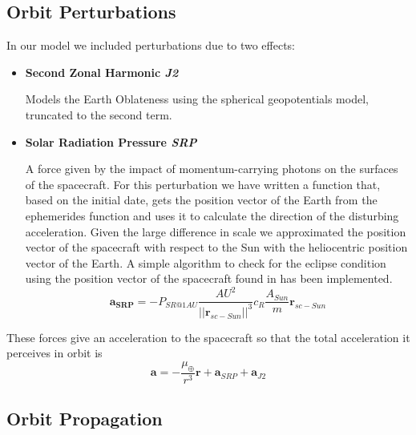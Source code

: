 \documentclass[11pt,a4paper]{report}
\renewcommand{\vec}[1]{\mathbf{#1}}
\begin{document}
\subsection{Orbit Perturbations}
In our model we included perturbations due to two effects:
\begin{itemize}
    \item \textbf{Second Zonal Harmonic \emph{J2}} \par Models the Earth Oblateness using the spherical geopotentials model, truncated to the second term.
    \item \textbf{Solar Radiation Pressure \emph{SRP}} \par A force given by the impact of momentum-carrying photons on the surfaces of the spacecraft. For this perturbation we have written a function that, based on the initial date, gets the position vector of the Earth from the ephemerides function and uses it to calculate the direction of the disturbing acceleration. Given the large difference in scale we approximated the position vector of the spacecraft with respect to the Sun with the heliocentric position vector of the Earth. A simple algorithm to check for the eclipse condition using the position vector of the spacecraft found in \cite{SRP_Curtis} has been implemented.
    \begin{equation}
        \vec{a_{SRP}} = -P_{SR@1AU}\frac{AU^2}{||\vec{r}_{sc-Sun}||^3}c_R\frac{A_{Sun}}{m}\vec{r}_{sc-Sun}
    \end{equation}
\end{itemize}

These forces give an acceleration to the spacecraft so that the total acceleration it perceives in orbit is
\begin{equation}
    \vec{a} = - \frac{\mu_{\oplus}}{r^3}\vec{r} + \vec{a}_{SRP} + \vec{a}_{J2}
\end{equation}

\subsection{Orbit Propagation}
\end{document}
